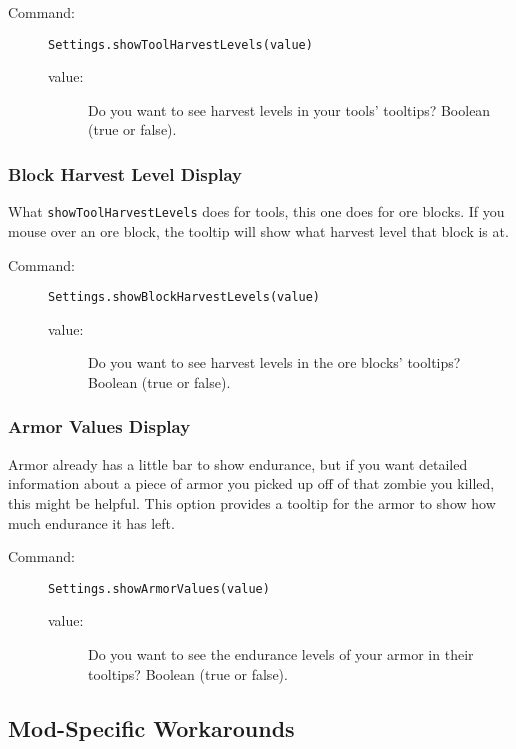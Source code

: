 \documentclass[letterpaper,titlepage,12pt]{article}
\begin{document}
\begin{description}
\item[Command:] \texttt{Settings.showToolHarvestLevels(value)}
\begin{description}
\item [value:] Do you want to see harvest levels in your tools' tooltips?  Boolean (true or false).
\end{description}
\end{description}

\subsubsection{Block Harvest Level Display}

What \texttt{showToolHarvestLevels} does for tools, this one does for ore blocks.  If you mouse over an ore block, the tooltip will show what harvest level that block is at.

\begin{description}
\item[Command:] \texttt{Settings.showBlockHarvestLevels(value)}
\begin{description}
\item [value:] Do you want to see harvest levels in the ore blocks' tooltips?  Boolean (true or false).
\end{description}
\end{description}

\subsubsection{Armor Values Display}

Armor already has a little bar to show endurance, but if you want detailed information about a piece of armor you picked up off of that zombie you killed, this might be helpful.  This option provides a tooltip for the armor to show how much endurance it has left.

\begin{description}
\item[Command:] \texttt{Settings.showArmorValues(value)}
\begin{description}
\item [value:] Do you want to see the endurance levels of your armor in their tooltips?  Boolean (true or false).
\end{description}
\end{description}

\subsection{Mod-Specific Workarounds}
\end{document}
